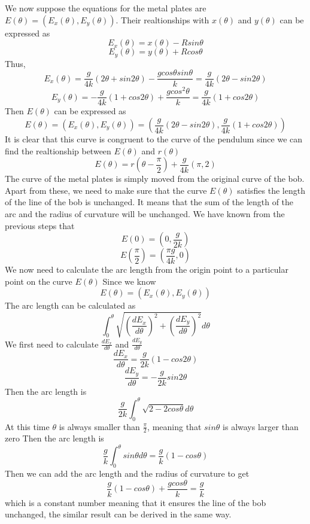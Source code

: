 \documentclass[12pt,a4paper]{article}
\begin{document}
We now suppose the equations for the metal plates are $E(\theta) = (E_x(\theta),E_y(\theta))$. Their realtionships with $x(\theta)$ and $y(\theta)$ can be expressed as
$$E_x(\theta) = x(\theta) - Rsin\theta$$
$$E_y(\theta) = y(\theta) + Rcos\theta$$
Thus,
$$E_x(\theta) = \frac{g}{4k}(2\theta+sin2\theta) - \frac{gcos\theta{sin}\theta}{k} = \frac{g}{4k}(2\theta-sin2\theta)$$
$$E_y(\theta) = -\frac{g}{4k}(1+cos2\theta) + \frac{gcos^2\theta}{k} = \frac{g}{4k}(1+cos2\theta)$$
Then $E(\theta)$ can be expressed as
\begin{equation}
    E(\theta) = (E_x(\theta),E_y(\theta)) = (\frac{g}{4k}(2\theta-sin2\theta),\frac{g}{4k}(1+cos2\theta))
\end{equation}
It is clear that this curve is congruent to the curve of the pendulum since we can find the realtionship between $E(\theta)$ and $r(\theta)$
\begin{equation}
    E(\theta) = r(\theta - \frac{\pi}{2})+\frac{g}{4k}(\pi,2)
\end{equation}
The curve of the metal plates is simply moved from the original curve of the bob.
Apart from these, we need to make sure that the curve $E(\theta)$ satisfies the length of the line of the bob is unchanged. It means that the sum of the length of the arc and the radius of curvature will be unchanged.
We have known from the previous steps that 
$$E(0) = (0,\frac{g}{2k})$$
$$E(\frac{\pi}{2}) = (\frac{\pi{g}}{4k},0)$$
We now need to calculate the arc length from the origin point to a particular point on the curve $E(\theta)$
Since we know
$$E(\theta) = (E_x(\theta),E_y(\theta))$$
The arc length can be calculated as
\begin{equation}
    \int_0^{\theta}\sqrt{(\frac{dE_x}{d\theta})^2+(\frac{dE_y}{d\theta})^2}d\theta
\end{equation}
We first need to calculate $\frac{dE_x}{d\theta}$ and $\frac{dE_y}{d\theta}$
$$\frac{dE_x}{d\theta} = \frac{g}{2k}(1-cos2\theta)$$
$$\frac{dE_y}{d\theta} = -\frac{g}{2k}sin2\theta$$
Then the arc length is 
$$\frac{g}{2k}\int_0^{\theta}\sqrt{2-2cos\theta}d\theta$$
At this time $\theta$ is always smaller than $\frac{\pi}{2}$, meaning that $sin \theta$ is always larger than zero
Then the arc length is 
$$\frac{g}{k}\int_0^{\theta}sin\theta{d}\theta = \frac{g}{k}(1-cos\theta)$$
Then we can add the arc length and the radius of curvature to get 
\begin{equation}
    \frac{g}{k}(1-cos\theta)+\frac{gcos\theta}{k} = \frac{g}{k}
\end{equation}
which is a constant number meaning that it ensures the line of the bob unchanged, the similar result can be derived in the same way.\\
\end{document}
